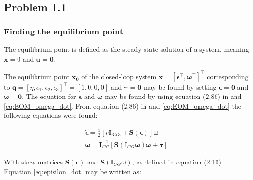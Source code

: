 \subsection*{Problem 1.1}

\subsubsection*{Finding the equilibrium point}

The equilibrium point is defined as the steady-state solution of a system, meaning $\dot{\mathbf{x}} = 0$ and $\mathbf{u}= \mathbf{0}$. 

The equilibrium point $\mathbf{x_0}$ of the closed-loop system $\mathbf{x} = [ \boldsymbol{\epsilon}^\top, \boldsymbol{\omega}^\top]^\top$ corresponding to $\mathbf{q} = [\eta,\epsilon_1, \epsilon_2, \epsilon_3]^\top = [1, 0, 0, 0]$ and $\boldsymbol{\tau} = \boldsymbol{0}$ may be found by setting $\dot{\boldsymbol{\epsilon}} = \mathbf{0}$ and $\dot{\boldsymbol{\omega}} = \mathbf{0}$. The equation for $\boldsymbol{\epsilon}$ and $\boldsymbol{\omega}$ may be found by using equation (2.86) in \cite{Fossen2011} and \eqref{eq:EOM_omega_dot}. From equation (2.86) in \cite{Fossen2011} and \eqref{eq:EOM_omega_dot} the following equations were found:

\begin{subequations}
\label{eq:x_dot}
	\begin{align}
		\dot{\boldsymbol{\epsilon}} =  \frac{1}{2} [ \eta \mathbf{I}_{3X3} + \mathbf{S}(\boldsymbol{\epsilon}) ] \boldsymbol{\omega}  \label{eq:episilon_dot} \\
		 \dot{\boldsymbol{\omega}} = \mathbf{I}_{CG}^{-1} [\mathbf{S} (\mathbf{I}_{CG} \boldsymbol{\omega} ) \boldsymbol{\omega} +  \boldsymbol{\tau} ] \label{eq:omega_dot}
	\end{align}	
\end{subequations}


With skew-matrices $\mathbf{S} (\boldsymbol{\epsilon})$ and $\mathbf{S} (\mathbf{I}_{CG} \boldsymbol{\omega} ) $, as defined in \cite{Fossen2011} equation (2.10). Equation \eqref{eq:episilon_dot} may be written as:


